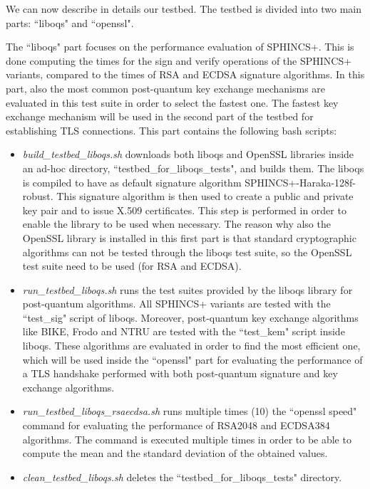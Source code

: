 \documentclass[a4paper,12pt]{article}
\begin{document}
We can now describe in details our testbed. The testbed is divided into two main parts: ``liboqs" and ``openssl".

The ``liboqs" part focuses on the performance evaluation of SPHINCS+. This is done computing the times for the sign and verify operations of the SPHINCS+ variants, compared to the times of RSA and ECDSA signature algorithms. In this part, also the most common post-quantum key exchange mechanisms are evaluated in this test suite in order to select the fastest one. The fastest key exchange mechanism will be used in the second part of the testbed for establishing TLS connections.
This part contains the following bash scripts:
\begin{itemize}
    \item \textit{build\_testbed\_liboqs.sh} downloads both liboqs and OpenSSL libraries inside an ad-hoc  directory, ``testbed\_for\_liboqs\_tests", and builds them. The liboqs is compiled to have as default signature algorithm SPHINCS+-Haraka-128f-robust. This signature algorithm is then used to create a public and private key pair and to issue X.509 certificates. This step is performed in order to enable the library to be used when necessary.
    The reason why also the OpenSSL library is installed in this first part is that standard cryptographic algorithms can not be tested through the liboqs test suite, so the OpenSSL test suite need to be used (for RSA and ECDSA).
    \item \textit{run\_testbed\_liboqs.sh} runs the test suites provided by the liboqs library for post-quantum algorithms. All SPHINCS+ variants are tested with the ``test\_sig" script of liboqs. Moreover, post-quantum key exchange algorithms like BIKE, Frodo and NTRU are tested with the ``test\_kem" script inside liboqs. These algorithms are evaluated in order to find the most efficient one, which will be used inside the ``openssl" part for evaluating the performance of a TLS handshake performed with both post-quantum signature and key exchange algorithms.
    \item \textit{run\_testbed\_liboqs\_rsaecdsa.sh}  runs multiple times (10) the ``openssl speed" command for evaluating the performance of RSA2048 and ECDSA384 algorithms. The command is executed multiple times in order to be able to compute the mean and the standard deviation of the obtained values.
    \item \textit{clean\_testbed\_liboqs.sh} deletes the ``testbed\_for\_liboqs\_tests" directory.
\end{itemize}
\end{document}
